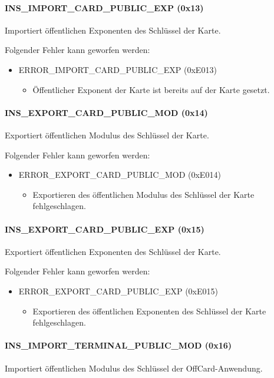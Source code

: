 \paragraph{INS\_IMPORT\_CARD\_PUBLIC\_EXP (0x13)} Importiert öffentlichen Exponenten des Schlüssel der Karte.

Folgender Fehler kann geworfen werden:
\begin{itemize}
	\item ERROR\_IMPORT\_CARD\_PUBLIC\_EXP (0xE013)
	\begin{itemize}
		\item Öffentlicher Exponent der Karte ist bereits auf der Karte gesetzt.
	\end{itemize}
\end{itemize}
\paragraph{INS\_EXPORT\_CARD\_PUBLIC\_MOD (0x14)} Exportiert öffentlichen Modulus des Schlüssel der Karte.

Folgender Fehler kann geworfen werden:
\begin{itemize}
	\item ERROR\_EXPORT\_CARD\_PUBLIC\_MOD (0xE014)
	\begin{itemize}
		\item Exportieren des öffentlichen Modulus des Schlüssel der Karte fehlgeschlagen.
	\end{itemize}
\end{itemize}
\paragraph{INS\_EXPORT\_CARD\_PUBLIC\_EXP (0x15)} Exportiert öffentlichen Exponenten des Schlüssel der Karte.

Folgender Fehler kann geworfen werden:
\begin{itemize}
	\item ERROR\_EXPORT\_CARD\_PUBLIC\_EXP (0xE015)
	\begin{itemize}
		\item Exportieren des öffentlichen Exponenten des Schlüssel der Karte fehlgeschlagen.
	\end{itemize}
\end{itemize}
\paragraph{INS\_IMPORT\_TERMINAL\_PUBLIC\_MOD (0x16)} Importiert öffentlichen Modulus des Schlüssel der OffCard-Anwendung.

